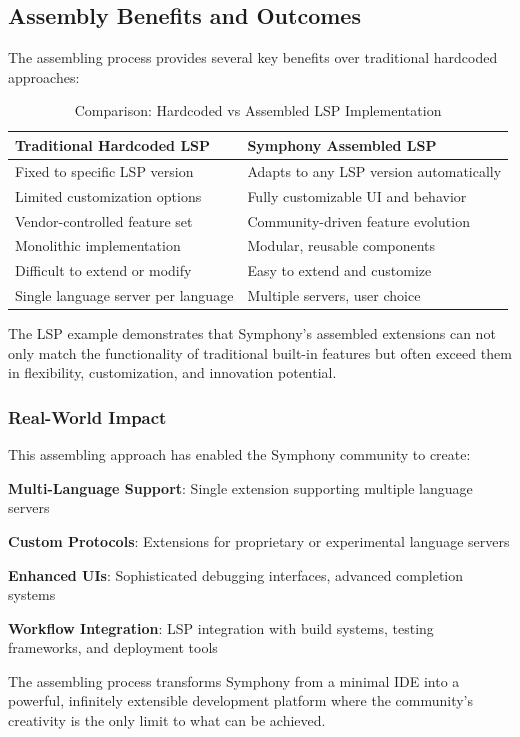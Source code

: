\subsection*{Assembly Benefits and Outcomes}

The assembling process provides several key benefits over traditional hardcoded approaches:

\begin{table}[ht]
\centering
\begin{tabular}{@{}p{}p{}@{}}
\toprule
\textbf{Traditional Hardcoded LSP} & \textbf{Symphony Assembled LSP} \\
\midrule
Fixed to specific LSP version & Adapts to any LSP version automatically \\
Limited customization options & Fully customizable UI and behavior \\
Vendor-controlled feature set & Community-driven feature evolution \\
Monolithic implementation & Modular, reusable components \\
Difficult to extend or modify & Easy to extend and customize \\
Single language server per language & Multiple servers, user choice \\
\bottomrule
\end{tabular}
\caption{Comparison: Hardcoded vs Assembled LSP Implementation}
\end{table}

\begin{alertbox}
The LSP example demonstrates that Symphony's assembled extensions can not only match the functionality of traditional built-in features but often exceed them in flexibility, customization, and innovation potential.
\end{alertbox}

\subsubsection*{Real-World Impact}

This assembling approach has enabled the Symphony community to create:

\begin{compactlist}
    \item \textbf{Multi-Language Support}: Single extension supporting multiple language servers
    \item \textbf{Custom Protocols}: Extensions for proprietary or experimental language servers
    \item \textbf{Enhanced UIs}: Sophisticated debugging interfaces, advanced completion systems
    \item \textbf{Workflow Integration}: LSP integration with build systems, testing frameworks, and deployment tools
\end{compactlist}

The assembling process transforms Symphony from a minimal IDE into a powerful, infinitely extensible development platform where the community's creativity is the only limit to what can be achieved.
